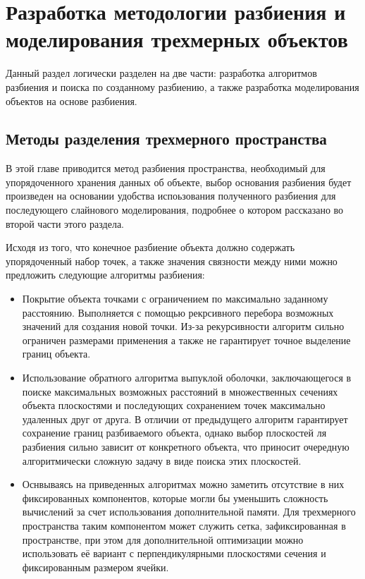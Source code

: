  \chapter{Разработка методологии разбиения и моделирования трехмерных объектов}

Данный раздел логически разделен на две части: разработка алгоритмов разбиения и поиска по созданному разбиению, а также разработка моделирования объектов на основе разбиения.

\section{Методы разделения трехмерного пространства}

В этой главе приводится метод разбиения пространства, необходимый для упорядоченного хранения данных об объекте, выбор основания разбиения будет произведен на основании удобства испоьзования полученного разбиения для последующего слайнового моделирования, подробнее о котором рассказано во второй части этого раздела.

Исходя из того, что конечное разбиение объекта должно содержать упорядоченный набор точек, а также значения связности между ними можно предложить следующие алгоритмы разбиения:

\begin{itemize}
	\item Покрытие объекта точками с ограничением по максимально заданному расстоянию. Выполняется с помощью рекрсивного перебора возможных значений для создания новой точки. Из-за рекурсивности алгоритм сильно ограничен размерами применения а также не гарантирует точное выделение границ объекта.
	\item  Использование обратного алгоритма выпуклой оболочки, заключающегося в поиске максимальных возможных расстояний в множественных сечениях объекта плоскостями и последующих сохранением точек максимально удаленных друг от друга. В отличии от предыдущего алгоритм гарантирует  сохранение границ разбиваемого объекта, однако выбор плоскостей ля разбиения сильно зависит от конкретного объекта, что приносит очередную алгоритмически сложную задачу в виде поиска этих плоскостей.
	\item  Оснвываясь на приведенных алгоритмах можно заметить отсутствие в них фиксированных компонентов, которые могли бы уменьшить сложность вычислений за счет использования дополнительной памяти. Для трехмерного пространства таким компонентом может служить сетка, зафиксированная в пространстве, при этом для дополнительной оптимизации можно использовать её вариант с перпендикулярными плоскостями сечения и фиксированным размером ячейки.
\end{itemize} 

